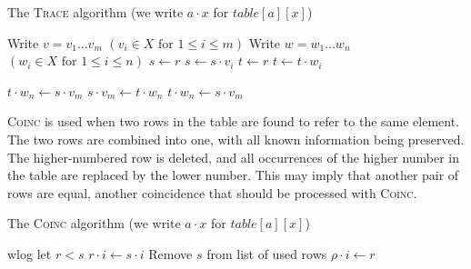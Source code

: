 \begin{algorithm}
\caption{The \textsc{Trace} algorithm (we write $a \cdot x$ for $table[a][x]$)}
\begin{algorithmic}[1]
\State Write $v = v_1 \dots v_m$ \Comment $(v_i \in X \text{~for~} 1 \leq i \leq m)$
\State Write $w = w_1 \dots w_n$ \Comment $(w_i \in X \text{~for~} 1 \leq i \leq n)$
\State $s \gets r$
    \State {}
  \EndIf
  \State $s \gets s \cdot v_i$
\EndFor
\State $t \gets r$
    \State {}
  \EndIf
  \State $t \gets t \cdot w_i$
\EndFor

  \State {}
  \State $t \cdot w_n \gets s \cdot v_m$
  \State $s \cdot v_m \gets t \cdot w_n$
  \State $t \cdot w_n \gets s \cdot v_m$
  \State {}
\EndIf

\EndProcedure
\end{algorithmic}
\end{algorithm}

\textsc{Coinc} is used when two rows in the table are found to refer to the same
element.  The two rows are combined into one, with all known information being
preserved.  The higher-numbered row is deleted, and all occurrences of the
higher number in the table are replaced by the lower number.  This may imply
that another pair of rows are equal, another coincidence that should be
processed with \textsc{Coinc}.

\begin{algorithm}
\caption{The \textsc{Coinc} algorithm (we write $a \cdot x$ for $table[a][x]$)}
\begin{algorithmic}[1]
\State wlog let $r < s$
    \State $r \cdot i \gets s \cdot i$
    \State {}
  \EndIf
\EndFor
\State Remove $s$ from list of used rows
      \State $\rho \cdot i \gets r$
    \EndIf
  \EndFor
\EndFor
\EndProcedure
\end{algorithmic}
\end{algorithm}


